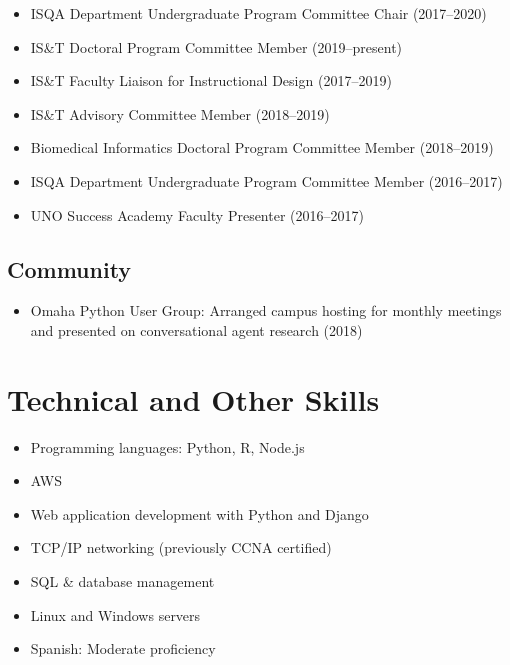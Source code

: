 \documentclass[10pt, letter]{article}
\begin{document}
\begin{itemize}
	\itemsep0em
	\item ISQA Department Undergraduate Program Committee Chair (2017--2020)
	\item IS\&T Doctoral Program Committee Member (2019--present)
	\item IS\&T Faculty Liaison for Instructional Design (2017--2019)
	\item IS\&T Advisory Committee Member (2018--2019)
	\item Biomedical Informatics Doctoral Program Committee Member (2018--2019)
	\item ISQA Department Undergraduate Program Committee Member (2016--2017)
	\item UNO Success Academy Faculty Presenter (2016--2017)
\end{itemize}

\subsection*{Community}
\begin{itemize}
	\itemsep0em
	\item Omaha Python User Group: Arranged campus hosting for monthly meetings and presented on conversational agent research (2018)
\end{itemize}



\section*{Technical and Other Skills}

\begin{itemize}
	\itemsep0em
	\item Programming languages: Python, R, Node.js
	\item AWS
	\item Web application development with Python and Django
	\item TCP/IP networking (previously CCNA certified)
	\item SQL \& database management
	\item Linux and Windows servers
	\item Spanish: Moderate proficiency
\end{itemize}
\end{document}
